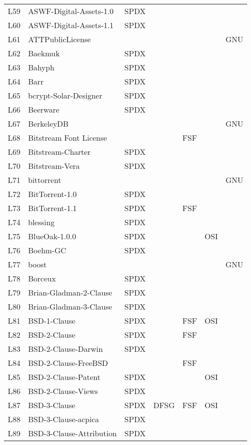 \begin{longtable}[h]{m{2cm} | m{7cm} | c | c | c | c | c}
  L59 & ASWF-Digital-Assets-1.0 & SPDX &  &  &  &  \\
  L60 & ASWF-Digital-Assets-1.1 & SPDX &  &  &  &  \\
  L61 & ATTPublicLicense &  &  &  &  & GNU \\
  L62 & Baekmuk & SPDX &  &  &  &  \\
  L63 & Bahyph & SPDX &  &  &  &  \\
  L64 & Barr & SPDX &  &  &  &  \\
  L65 & bcrypt-Solar-Designer & SPDX &  &  &  &  \\
  L66 & Beerware & SPDX &  &  &  &  \\
  L67 & BerkeleyDB &  &  &  &  & GNU \\
  L68 & Bitstream Font License &  &  & FSF &  &  \\
  L69 & Bitstream-Charter & SPDX &  &  &  &  \\
  L70 & Bitstream-Vera & SPDX &  &  &  &  \\
  L71 & bittorrent &  &  &  &  & GNU \\
  L72 & BitTorrent-1.0 & SPDX &  &  &  &  \\
  L73 & BitTorrent-1.1 & SPDX &  & FSF &  &  \\
  L74 & blessing & SPDX &  &  &  &  \\
  L75 & BlueOak-1.0.0 & SPDX &  &  & OSI &  \\
  L76 & Boehm-GC & SPDX &  &  &  &  \\
  L77 & boost &  &  &  &  & GNU \\
  L78 & Borceux & SPDX &  &  &  &  \\
  L79 & Brian-Gladman-2-Clause & SPDX &  &  &  &  \\
  L80 & Brian-Gladman-3-Clause & SPDX &  &  &  &  \\
  L81 & BSD-1-Clause & SPDX &  & FSF & OSI &  \\
  L82 & BSD-2-Clause & SPDX &  & FSF &  &  \\
  L83 & BSD-2-Clause-Darwin & SPDX &  &  &  &  \\
  L84 & BSD-2-Clause-FreeBSD &  &  & FSF &  &  \\
  L85 & BSD-2-Clause-Patent & SPDX &  &  & OSI &  \\
  L86 & BSD-2-Clause-Views & SPDX &  &  &  &  \\
  L87 & BSD-3-Clause & SPDX & DFSG & FSF & OSI &  \\
  L88 & BSD-3-Clause-acpica & SPDX &  &  &  &  \\
  L89 & BSD-3-Clause-Attribution & SPDX &  &  &  &  \\

\end{longtable}

